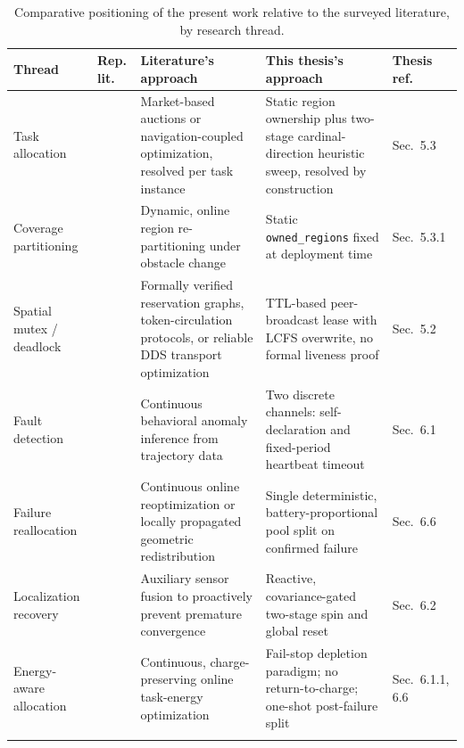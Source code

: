 \clearpage

\begin{table}[p]
\centering
\small 
\renewcommand{\arraystretch}{1.5}
\setlength{\tabcolsep}{7pt} 
\caption{Comparative positioning of the present work relative to the surveyed literature, by research thread.}
\label{tab:lit_review_comparison}
\begin{tabularx}{\textwidth}{@{} 
  >{\raggedright\arraybackslash}p{1.4cm} 
  >{\raggedright\arraybackslash}p{1.4cm} 
  X 
  X 
  >{\raggedright\arraybackslash}p{0.8cm} @{}}
\toprule
\textbf{Thread} & \textbf{Rep. lit.} & \textbf{Literature's approach} & \textbf{This thesis's approach} & \textbf{Thesis ref.} \\ \midrule
Task allocation & \cite{chakraa2023optimization,quinton2023market,agrawal2022dcmrta} & Market-based auctions or navigation-coupled optimization, resolved per task instance & Static region ownership plus two-stage cardinal-direction heuristic sweep, resolved by construction & Sec.~5.3 \\ \addlinespace
Coverage partitioning & \cite{sharma2026darp} & Dynamic, online region re-partitioning under obstacle change & Static \texttt{owned\_regions} fixed at deployment time & Sec.~5.3.1 \\ \addlinespace
Spatial mutex / deadlock & \cite{grover2023deadlock,pratissoli2024hierarchical,he2023deadlock,parihar2022token,lee2025optimizing} & Formally verified reservation graphs, token-circulation protocols, or reliable DDS transport optimization & TTL-based peer-broadcast lease with LCFS overwrite, no formal liveness proof & Sec.~5.2 \\ \addlinespace
Fault detection & \cite{lee2022datadriven,bossens2022resilient} & Continuous behavioral anomaly inference from trajectory data & Two discrete channels: self-declaration and fixed-period heartbeat timeout & Sec.~6.1 \\ \addlinespace
Failure reallocation & \cite{mayya2021resilient,gong2024resilient} & Continuous online reoptimization or locally propagated geometric redistribution & Single deterministic, battery-proportional pool split on confirmed failure & Sec.~6.6 \\ \addlinespace
Localization recovery & \cite{macenski2023fromdesks,shi2022vision} & Auxiliary sensor fusion to proactively prevent premature convergence & Reactive, covariance-gated two-stage spin and global reset & Sec.~6.2 \\ \addlinespace
Energy-aware allocation & \cite{notomista2022resilient,djenadi2022energyaware} & Continuous, charge-preserving online task-energy optimization & Fail-stop depletion paradigm; no return-to-charge; one-shot post-failure split & Sec.~6.1.1, 6.6 \\ \addlinespace

\end{tabularx}
\end{table}
